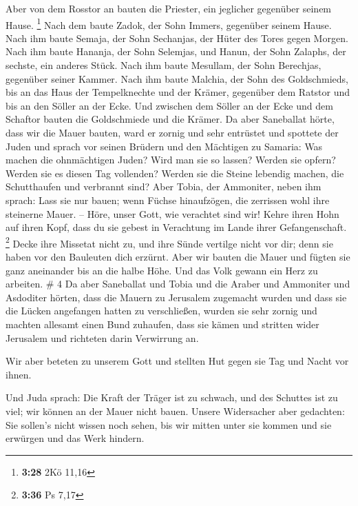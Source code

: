  Aber von dem Rosstor an bauten die Priester, ein jeglicher
gegenüber seinem Hause. \footnote{\textbf{3:28} 2Kö 11,16} 
Nach dem baute Zadok, der Sohn Immers, gegenüber seinem Hause. Nach ihm
baute Semaja, der Sohn Sechanjas, der Hüter des Tores gegen Morgen.
 Nach ihm baute Hananja, der Sohn Selemjas, und Hanun, der
Sohn Zalaphs, der sechste, ein anderes Stück. Nach ihm baute Mesullam,
der Sohn Berechjas, gegenüber seiner Kammer.  Nach ihm
baute Malchia, der Sohn des Goldschmieds, bis an das Haus der
Tempelknechte und der Krämer, gegenüber dem Ratstor und bis an den
Söller an der Ecke.  Und zwischen dem Söller an der Ecke
und dem Schaftor bauten die Goldschmiede und die Krämer. 
Da aber Saneballat hörte, dass wir die Mauer bauten, ward er zornig und
sehr entrüstet und spottete der Juden  und sprach vor
seinen Brüdern und den Mächtigen zu Samaria: Was machen die ohnmächtigen
Juden? Wird man sie so lassen? Werden sie opfern? Werden sie es diesen
Tag vollenden? Werden sie die Steine lebendig machen, die Schutthaufen
und verbrannt sind?  Aber Tobia, der Ammoniter, neben ihm
sprach: Lass sie nur bauen; wenn Füchse hinaufzögen, die zerrissen wohl
ihre steinerne Mauer. --  Höre, unser Gott, wie verachtet
sind wir! Kehre ihren Hohn auf ihren Kopf, dass du sie gebest in
Verachtung im Lande ihrer Gefangenschaft. \footnote{\textbf{3:36} Ps
  7,17}  Decke ihre Missetat nicht zu, und ihre Sünde
vertilge nicht vor dir; denn sie haben vor den Bauleuten dich erzürnt.
 Aber wir bauten die Mauer und fügten sie ganz aneinander
bis an die halbe Höhe. Und das Volk gewann ein Herz zu arbeiten. \# 4
 Da aber Saneballat und Tobia und die Araber und Ammoniter
und Asdoditer hörten, dass die Mauern zu Jerusalem zugemacht wurden und
dass sie die Lücken angefangen hatten zu verschließen, wurden sie sehr
zornig  und machten allesamt einen Bund zuhaufen, dass sie
kämen und stritten wider Jerusalem und richteten darin Verwirrung an.

 Wir aber beteten zu unserem Gott und stellten Hut gegen sie
Tag und Nacht vor ihnen.

 Und Juda sprach: Die Kraft der Träger ist zu schwach, und
des Schuttes ist zu viel; wir können an der Mauer nicht bauen.
 Unsere Widersacher aber gedachten: Sie sollen's nicht
wissen noch sehen, bis wir mitten unter sie kommen und sie erwürgen und
das Werk hindern.

